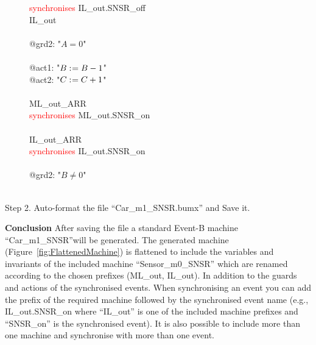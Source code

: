 \begin{description}
\begin{center}
\begin{Bcode}
			\Btab \textcolor{red}{synchronises} IL_out.SNSR_off\\
			\Btab \Brefines{} IL_out\\
			\Btab \Bwhen\\
			\Btab \Btab @grd2: "\(A = 0\)"\\
			\Btab \Bthen\\
			\Btab \Btab @act1: "\(B \mathrel{:\mkern1mu=} B - 1\)"\\
			\Btab \Btab @act2: "\(C \mathrel{:\mkern1mu=} C + 1\)"\\
			\Btab \Bend\\
			\Btab ML_out_ARR\\
			\Btab \textcolor{red}{synchronises} ML_out.SNSR_on\\
			\Btab \Bend\\
			\Btab IL_out_ARR\\
			\Btab \textcolor{red}{synchronises} IL_out.SNSR_on\\
			\Btab \Bwhen\\
			\Btab \Btab @grd2: "\(B \neq 0\)"\\
			\Btab \Bend\\
			\Bend
			\fi
		\end{Bcode}
	\end{center}
	\item[Step 2. Auto-format the file ``Car\_m1\_SNSR.bumx'' and Save it.]
\end{description}
\textbf{Conclusion} After saving the file a standard Event-B machine ``Car\_m1\_SNSR''will be generated. The generated machine (Figure~\ref{fig:FlattenedMachine}) is flattened to include the variables and invariants  of the included machine ``Sensor\_m0\_SNSR'' which are renamed according to the chosen prefixes (ML\_out, IL\_out). In addition to the guards and actions of the synchronised events. When synchronising an event you can add the prefix of the required machine followed by the synchronised event name (e.g., IL\_out.SNSR\_on where ``IL\_out'' is one of the included machine prefixes and ``SNSR\_on'' is the synchronised event). It is also possible to include more than one machine and synchronise with more than one event.

